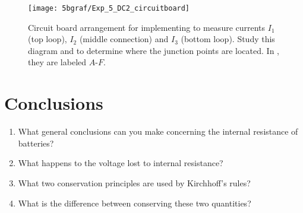 \begin{figure} \centering
	\label{f:circboard}
	\centering
	\texttt{[image: 5bgraf/Exp\_5\_DC2\_circuitboard]}
	\caption{Circuit board arrangement for implementing  to measure currents $I_{1}$ (top loop), $I_{2}$ (middle connection) and $I_{3}$ (bottom loop).  Study this diagram and  to determine where the junction points are located.  In , they are labeled $A$-$F$. }
\end{figure}
\clearpage

\section {Conclusions}
\begin{enumerate}
	\item  What general conclusions can you make concerning the internal resistance of batteries?  
	\item What happens to the voltage lost to internal resistance?  
	\item What two conservation principles are used by Kirchhoff's rules?  
	\item What is the difference between conserving these two quantities?
\end{enumerate}

